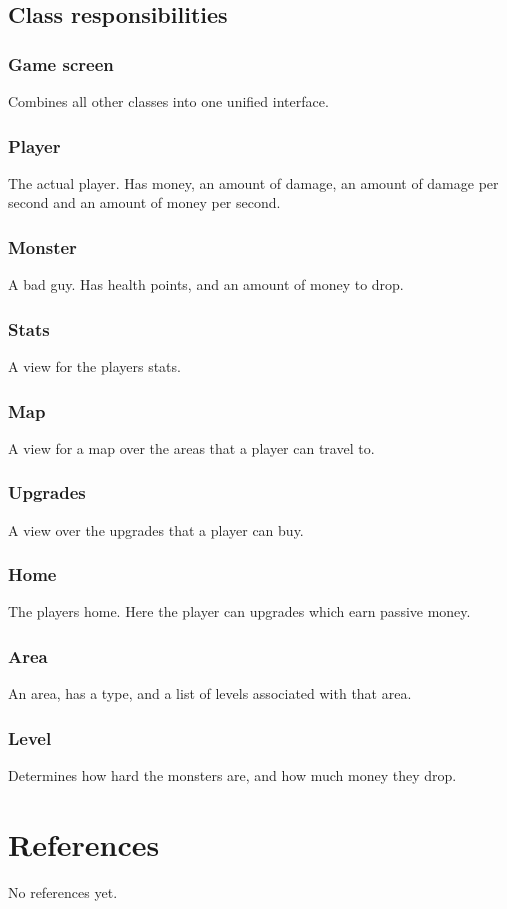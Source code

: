 \documentclass{article}
\begin{document}
\subsection{Class responsibilities}
\subsubsection{Game screen}
Combines all other classes into one unified interface.
\subsubsection{Player}
The actual player. Has money, an amount of damage, an amount of damage per second and an amount of money per second.
\subsubsection{Monster}
A bad guy. Has health points, and an amount of money to drop.
\subsubsection{Stats}
A view for the players stats.
\subsubsection{Map}
A view for a map over the areas that a player can travel to.
\subsubsection{Upgrades}
A view over the upgrades that a player can buy.
\subsubsection{Home}
The players home. Here the player can upgrades which earn passive money. 
\subsubsection{Area}
An area, has a type, and a list of levels associated with that area.
\subsubsection{Level}
Determines how hard the monsters are, and how much money they drop.
\section{References}
No references yet.
\end{document}
